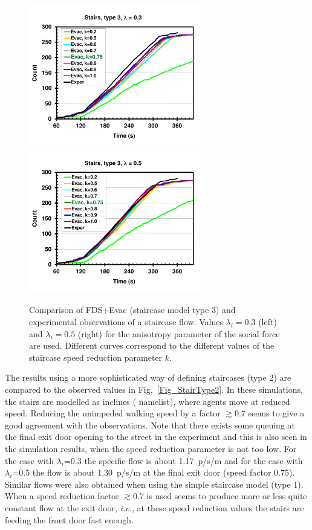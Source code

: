 \documentclass[12pt,a4paper,final,twoside]{stylevk}
\begin{document}
\begin{enumerate}
%
\begin{figure}[!tb]
  \centerline{\includegraphics[clip=true,
    width=75mm]{FIGURES/OfficeStairs_Exper_vs_Evac_Type3_L0p3}\includegraphics[clip=true,
    width=75mm]{FIGURES/OfficeStairs_Exper_vs_Evac_Type3_L0p5}}
  \caption{Comparison of FDS+Evac (staircase model type 3) and
    experimental observations of a staircase flow.  Values
    $\lambda_i=0.3$ (left) and $\lambda_i=0.5$ (right) for the
    anisotropy parameter of the social force are used.  Different
    curves correspond to the different values of the staircase speed
    reduction parameter $k$.}\label{Fig_StairType3}
\end{figure}

The results using a more sophisticated way of defining staircases
(type 2) are compared to the observed values in
Fig.~\ref{Fig_StairType2}.  In these simulations, the stairs are
modelled as inclines ( namelist), where agents move at
reduced speed.  Reducing the unimpeded walking speed by a factor
$\gtrsim$0.7 seems to give a good agreement with the observations.
Note that there exists some queuing at the final exit door opening to
the street in the experiment and this is also seen in the simulation
results, when the speed reduction parameter is not too low.  For the
case with $\lambda_i$=0.3 the specific flow is about 1.17~p/s/m and
for the case with $\lambda_i$=0.5 the flow is about 1.30~p/s/m at the
final exit door (speed factor 0.75).  Similar flows were also obtained
when using the simple staircase model (type 1).  When a speed
reduction factor $\gtrsim$0.7 is used seems to produce more or less
quite constant flow at the exit door, \emph{i.e.}, at these speed
reduction values the stairs are feeding the front door fast enough.
%



\end{enumerate}
\end{document}
